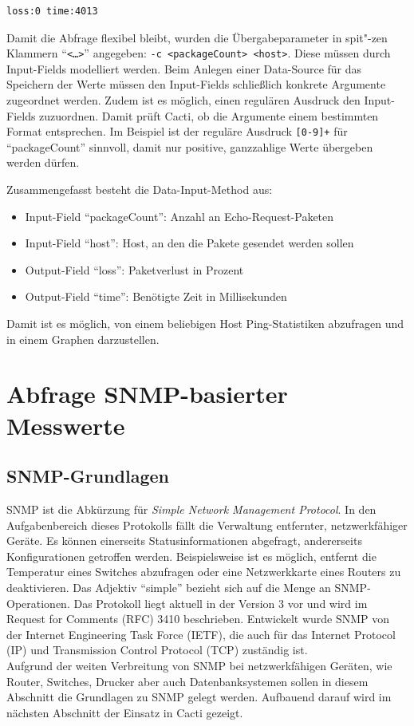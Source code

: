 \documentclass[12pt,ngerman,toc=listofnumbered,toc=bibliographynumbered,toc=index,headsepline=true]{scrbook}
\begin{document}
\begin{lstlisting}[xleftmargin=20pt]
loss:0 time:4013
\end{lstlisting}

Damit die Abfrage flexibel bleibt, 
wurden die Übergabeparameter in 
spit"-zen
Klammern \enquote{\texttt{<\ldots>}} angegeben: \texttt{-c <packageCount>
<host>}. Diese müssen durch Input-Fields modelliert werden. Beim Anlegen einer
Data-Source für das Speichern der Werte müssen den Input-Fields schließlich konkrete
Argumente zugeordnet werden. Zudem ist es möglich, einen regulären Ausdruck den
Input-Fields zuzuordnen. Damit prüft Cacti, ob die Argumente einem bestimmten
Format entsprechen. Im Beispiel ist der reguläre Ausdruck \texttt{[0-9]+} für
\enquote{packageCount} sinnvoll, damit nur positive, ganzzahlige Werte übergeben
werden dürfen.

Zusammengefasst besteht die Data-Input-Method aus:
\begin{itemize}
  \item Input-Field \enquote{packageCount}: Anzahl an Echo-Request-Paketen
  \item Input-Field \enquote{host}: Host, an den die Pakete gesendet werden
  sollen
  \item Output-Field \enquote{loss}: Paketverlust in Prozent
  \item Output-Field \enquote{time}: Benötigte Zeit in Millisekunden
\end{itemize}
Damit ist es möglich, von einem beliebigen Host Ping-Statistiken abzufragen und
in einem Graphen darzustellen.

\section{Abfrage SNMP-basierter Messwerte}
\subsection{SNMP-Grundlagen}
SNMP ist die Abkürzung für \textit{Simple Network Management Protocol}. In den
Aufgabenbereich dieses Protokolls fällt die Verwaltung entfernter,
netzwerkfähiger Geräte. Es können einerseits Statusinformationen abgefragt,
andererseits Konfigurationen getroffen werden. Beispielsweise ist es möglich,
entfernt die Temperatur eines Switches abzufragen oder eine Netzwerkkarte eines
Routers zu deaktivieren. Das Adjektiv \enquote{simple} bezieht sich auf die
Menge an SNMP-Operationen. Das Protokoll liegt aktuell in der
Version 3 vor und wird im Request for Comments (RFC) 3410 \cite{RFC3410}
beschrieben. Entwickelt wurde SNMP von der Internet Engineering Task Force
(IETF), die auch für das Internet Protocol (IP) und Transmission Control
Protocol (TCP) zuständig ist.\\
Aufgrund der weiten Verbreitung von SNMP bei netzwerkfähigen Geräten, wie
Router, Switches, Drucker aber auch Datenbanksystemen sollen in diesem Abschnitt
die Grundlagen zu SNMP gelegt werden. Aufbauend darauf wird im nächsten
Abschnitt der Einsatz in Cacti gezeigt.
\end{document}
